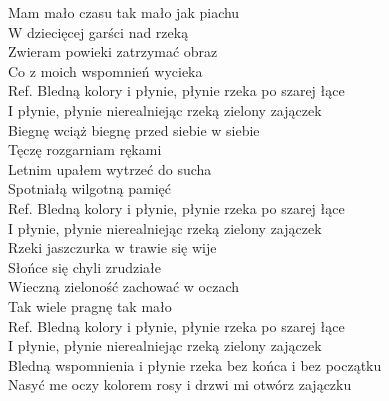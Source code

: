 
Mam mało czasu tak mało jak piachu  \tab{} \\
W dziecięcej garści nad rzeką  \tab{}\tab{} \\
Zwieram powieki zatrzymać obraz  \tab{} \\
Co z moich wspomnień wycieka  \tab{} \\
\hops
Ref. Bledną kolory i płynie, płynie rzeka po szarej łące  \\
 I płynie, płynie nierealniejąc rzeką zielony zajączek  \\
\hops
Biegnę wciąż biegnę przed siebie w siebie \\
Tęczę rozgarniam rękami \\
Letnim upałem wytrzeć do sucha \\
Spotniałą wilgotną pamięć \\
\hops
Ref. Bledną kolory i płynie, płynie rzeka po szarej łące\\
 I płynie, płynie nierealniejąc rzeką zielony zajączek \\
\hops
Rzeki jaszczurka w trawie się wije \\
Słońce się chyli zrudziałe \\
Wieczną zieloność zachować w oczach \\
Tak wiele pragnę tak mało \\
\hops
Ref. Bledną kolory i płynie, płynie rzeka po szarej łące\\
 I płynie, płynie nierealniejąc rzeką zielony zajączek \\
\hops
{} Bledną wspomnienia i płynie rzeka bez końca i bez początku \\
 Nasyć me oczy kolorem rosy i drzwi mi otwórz zajączku